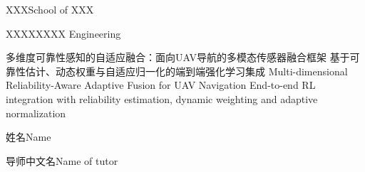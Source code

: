 
\school
{XXX}{School of XXX}

\major
{XXXX}{XXXX Engineering}

\thesistitle
{多维度可靠性感知的自适应融合：面向UAV导航的多模态传感器融合框架}
{基于可靠性估计、动态权重与自适应归一化的端到端强化学习集成}
{Multi-dimensional Reliability-Aware Adaptive Fusion for UAV Navigation}
{End-to-end RL integration with reliability estimation, dynamic weighting and adaptive normalization}

\thesisauthor
{姓名}{Name}

\teacher
{导师中文名}{Name of tutor}






